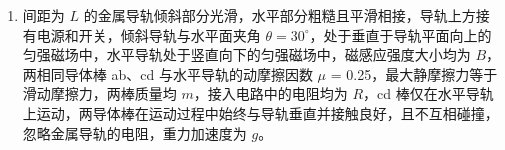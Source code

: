 \documentclass[\gkver]{gaokaozhenti}
\begin{document}
\begin{enumerate}
{	$m_{A}g(R - R\cos 53^\circ) = \frac{1}{2}m_{A}v_{0}^{2}$

	解得 $v_{0} = 2 \Ums$

	在最低点根据牛顿第二定律

	$F_{\mathrm{N}} - m_{A}g = m_{A}\frac{v_{0}^{2}}{R}$

	解得 $F_{\mathrm{N}} = 72 \UN$，方向竖直向上；

	（2）根据题意 AB 碰后成一整体，根据动量守恒 $m_{A}v_{0} = (m_{A} + m_{B})v_{\text{共}}$

	解得 $v_{\text{共}} = 1.6 \Ums$

	故 A 与 B 整个碰撞过程中损失的机械能为

	$\Delta E = \frac{1}{2}m_{A}v_{0}^{2} - \frac{1}{2}(m_{A} + m_{B})v_{\text{共}}^{2} = 1.6 \UJ$

	（3）第一种情况，当传送带速度 $v$ 小于 $v_{\text{共}}$ 时，AB 滑上传送带后先减速后匀速运动，设 AB 与传送带间的动摩擦因数为 $\mu$，对 AB 根据牛顿第二定律 $\mu(m_{A} + m_{B})g = (m_{A} + m_{B})a$

	设经过时间 $t_{1}$ 后 AB 与传送带共速，可得 $v = v_{\text{共}} - at_{1}$

	该段时间内 AB 运动的位移为

	$x_{1} = \frac{v + v_{\text{共}}}{2}t_{1}$

	传送带运动的位移为 $x_{2} = vt_{1}$

	故可得 $Q = \mu(m_{A} + m_{B})g\cdot(x_{1} - x_{2})$

	联立解得 $v = 0.6 \Ums$，另一解大于 $v_{\text{共}}$ 舍去；

	第二种情况，当传送带速度 $v$ 大于 $v_{\text{共}}$ 时，AB 滑上传送带后先加速后匀速运动，设经过时间 $t_{2}$ 后 AB 与传送带共速，同理可得 $v = v_{\text{共}} + at_{2}$

	该段时间内 AB 运动的位移为 $x_{1}' = \frac{v + v_{\text{共}}}{2}t_{2}$

	传送带运动的位移为 $x_{2}' = vt_{2}$

	故可得 $Q = \mu(m_{A} + m_{B})g\cdot(x_{2}' - x_{1}')$

	解得 $v = 2.6 \Ums$，另一解小于 $v_{\text{共}}$ 舍去。
}

\item
间距为 $L$ 的金属导轨倾斜部分光滑，水平部分粗糙且平滑相接，导轨上方接有电源和开关，倾斜导轨与水平面夹角 $\theta = 30^\circ$，处于垂直于导轨平面向上的匀强磁场中，水平导轨处于竖直向下的匀强磁场中，磁感应强度大小均为 $B$，两相同导体棒 ab、cd 与水平导轨的动摩擦因数 $\mu$ = 0.25，最大静摩擦力等于滑动摩擦力，两棒质量均 $m$，接入电路中的电阻均为 $R$，cd 棒仅在水平导轨上运动，两导体棒在运动过程中始终与导轨垂直并接触良好，且不互相碰撞，忽略金属导轨的电阻，重力加速度为 $g$。


\end{enumerate}
\end{document}
